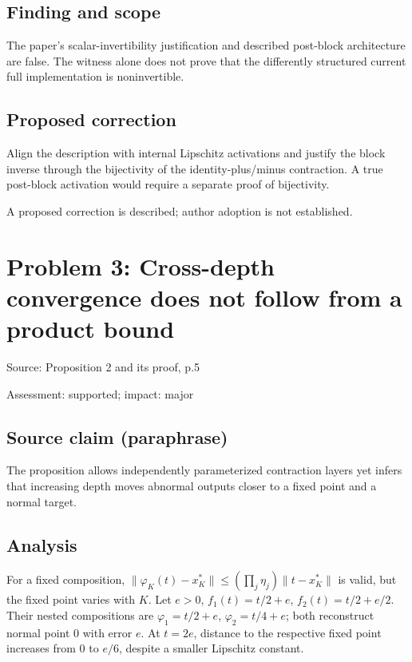 \documentclass[11pt]{article}
\begin{document}
\subsection*{Finding and scope}

The paper’s scalar-invertibility justification and described post-block architecture are false. The witness alone does not prove that the differently structured current full implementation is noninvertible.

\subsection*{Proposed correction}

Align the description with internal Lipschitz activations and justify the block inverse through the bijectivity of the identity-plus/minus contraction. A true post-block activation would require a separate proof of bijectivity.

A proposed correction is described; author adoption is not established.

\section*{Problem 3: Cross-depth convergence does not follow from a product bound}

Source: Proposition 2 and its proof, p.5

Assessment: supported; impact: major

\subsection*{Source claim (paraphrase)}

The proposition allows independently parameterized contraction layers yet infers that increasing depth moves abnormal outputs closer to a fixed point and a normal target.

\subsection*{Analysis}

For a fixed composition, \(\|\varphi_K(t)-x_K^*\|\le(\prod_j\eta_j)\|t-x_K^*\|\) is valid, but the fixed point varies with \(K\). Let \(e>0\), \(f_1(t)=t/2+e\), \(f_2(t)=t/2+e/2\). Their nested compositions are \(\varphi_1=t/2+e\), \(\varphi_2=t/4+e\); both reconstruct normal point \(0\) with error \(e\). At \(t=2e\), distance to the respective fixed point increases from \(0\) to \(e/6\), despite a smaller Lipschitz constant.
\end{document}
